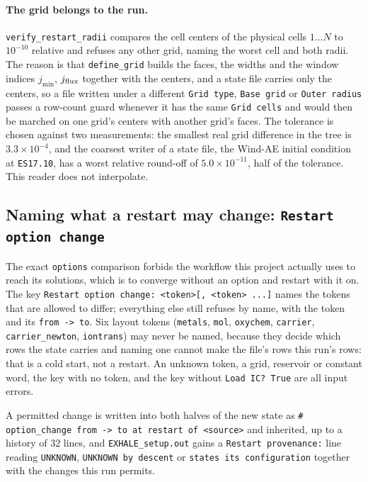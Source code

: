 \documentclass[english,a4paper]{my_memo}
\begin{document}
\paragraph{The grid belongs to the run.} \verb|verify_restart_radii|
compares the cell centers of the physical cells $1 \ldots N$ to $10^{-10}$
relative and refuses any other grid, naming the worst cell and both radii.
The reason is that \verb|define_grid| builds the faces, the widths and the
window indices $j_{\min}$, $j_{\rm flux}$ together with the centers, and a
state file carries only the centers, so a file written under a different
\verb|Grid type|, \verb|Base grid| or \verb|Outer radius| passes a row-count
guard whenever it has the same \verb|Grid cells| and would then be marched
on one grid's centers with another grid's faces. The tolerance is chosen
against two measurements: the smallest real grid difference in the tree is
$3.3\times10^{-4}$, and the coarsest writer of a state file, the Wind-AE
initial condition at \verb|ES17.10|, has a worst relative round-off of
$5.0\times10^{-11}$, half of the tolerance. This reader does not
interpolate.

\subsection{Naming what a restart may change: \texttt{Restart option change}}

The exact \verb|options| comparison forbids the workflow this project
actually uses to reach its solutions, which is to converge without an option
and restart with it on. The key
\verb|Restart option change: <token>[, <token> ...]| names the tokens that
are allowed to differ; everything else still refuses by name, with the
token and its \verb|from -> to|. Six layout tokens (\verb|metals|,
\verb|mol|, \verb|oxychem|, \verb|carrier|, \verb|carrier_newton|,
\verb|iontrans|) may never be named, because they decide which rows the
state carries and naming one cannot make the file's rows this run's rows:
that is a cold start, not a restart. An unknown token, a grid, reservoir or
constant word, the key with no token, and the key without
\verb|Load IC? True| are all input errors.

A permitted change is written into both halves of the new state as
\verb|# option_change from -> to at restart of <source>| and inherited, up
to a history of 32 lines, and \verb|EXHALE_setup.out| gains a
\verb|Restart provenance:| line reading \verb|UNKNOWN|,
\verb|UNKNOWN by descent| or \verb|states its configuration| together with
the changes this run permits.
\end{document}
